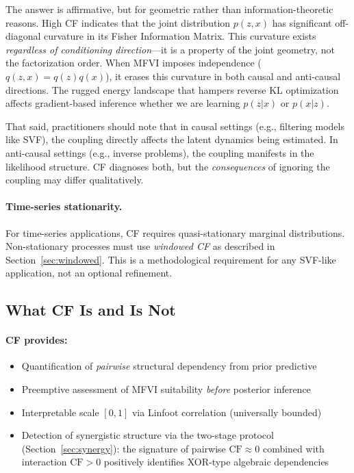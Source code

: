 \documentclass[10pt]{article} %
\theoremstyle{plain}
\theoremstyle{definition}
\newcommand{\CF}{\mathrm{CF}}
\begin{document}
The answer is affirmative, but for geometric rather than information-theoretic reasons. High CF indicates that the joint distribution $p(z,x)$ has significant off-diagonal curvature in its Fisher Information Matrix. This curvature exists \emph{regardless of conditioning direction}---it is a property of the joint geometry, not the factorization order. When MFVI imposes independence ($q(z,x) = q(z)q(x)$), it erases this curvature in both causal and anti-causal directions. The rugged energy landscape that hampers reverse KL optimization affects gradient-based inference whether we are learning $p(z|x)$ or $p(x|z)$.

That said, practitioners should note that in causal settings (e.g., filtering models like SVF), the coupling directly affects the latent dynamics being estimated. In anti-causal settings (e.g., inverse problems), the coupling manifests in the likelihood structure. CF diagnoses both, but the \emph{consequences} of ignoring the coupling may differ qualitatively.

\paragraph{Time-series stationarity.} For time-series applications, CF requires quasi-stationary marginal distributions. Non-stationary processes must use \emph{windowed CF} as described in Section~\ref{sec:windowed}. This is a methodological requirement for any SVF-like application, not an optional refinement.

\subsection{What CF Is and Is Not}
\label{sec:what_cf_is}

\paragraph{CF provides:}
\begin{itemize}
    \item Quantification of \emph{pairwise} structural dependency from prior predictive
    \item Preemptive assessment of MFVI suitability \emph{before} posterior inference
    \item Interpretable scale $[0,1]$ via Linfoot correlation (universally bounded)
    \item Detection of synergistic structure via the two-stage protocol (Section~\ref{sec:synergy}): the signature of pairwise $\CF \approx 0$ combined with interaction $\CF > 0$ positively identifies XOR-type algebraic dependencies
\end{itemize}
\end{document}

